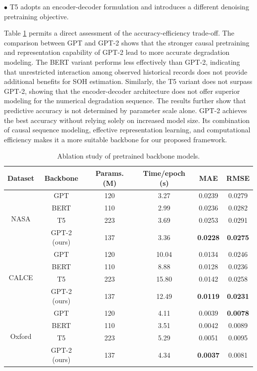 \documentclass[preprint,12pt]{elsarticle}
\begin{document}
$\bullet$ T5 adopts an encoder-decoder formulation and introduces a different denoising pretraining objective. 



Table \ref{tab:backbone_ablation} permits a direct assessment of the accuracy-efficiency trade-off. The comparison between GPT and GPT-2 shows that the stronger causal pretraining and representation capability of GPT-2 lead to more accurate degradation modeling. The BERT variant performs less effectively than GPT-2, indicating that unrestricted interaction among observed historical records does not provide additional benefits for SOH estimation. Similarly, the T5 variant does not surpass GPT-2, showing that the encoder-decoder architecture does not offer superior modeling for the numerical degradation sequence.
The results further show that predictive accuracy is not determined by parameter scale alone. GPT-2 achieves the best accuracy without relying solely on increased model size. Its combination of causal sequence modeling, effective representation learning, and computational efficiency makes it a more suitable backbone for our proposed framework.



\begin{table}[t]
\centering
\caption{Ablation study of pretrained backbone models.}
\label{tab:backbone_ablation}
\setlength{\tabcolsep}{2pt}
\renewcommand{\arraystretch}{1.15}
\begin{tabular}{c|c|c|c|cc}
\hline
\textbf{Dataset} & \textbf{Backbone} & \textbf{Params. (M)}
& \textbf{Time/epoch (s)} & \textbf{MAE} & \textbf{RMSE} \\
\hline
\multirow{4}{*}{NASA}
& GPT          & 120 & 3.27 & 0.0239 & 0.0279 \\
& BERT         & 110 & 2.99 & 0.0236 & 0.0282 \\
& T5           & 223 & 3.69 & 0.0253 & 0.0291 \\
& GPT-2 (ours) & 137 & 3.36 & \textbf{0.0228} & \textbf{0.0275} \\
\hline
\multirow{4}{*}{CALCE}
& GPT          & 120 & 10.04 & 0.0134 & 0.0246 \\
& BERT         & 110 & 8.88 & 0.0128 & 0.0236 \\
& T5           & 223 & 15.80 & 0.0142 & 0.0258 \\
& GPT-2 (ours) & 137 & 12.49 & \textbf{0.0119} & \textbf{0.0231} \\
\hline
\multirow{4}{*}{Oxford}
& GPT          & 120 & 4.11 & 0.0039 & \textbf{0.0078} \\
& BERT         & 110 & 3.51 & 0.0042 & 0.0089 \\
& T5           & 223 & 5.29 & 0.0051 & 0.0095 \\
& GPT-2 (ours) & 137 & 4.34 & \textbf{0.0037} & 0.0081 \\
\hline
\end{tabular}
\end{table}
\end{document}
